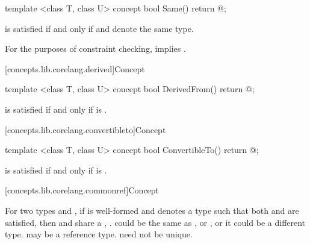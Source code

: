 %
\begin{itemdecl}
template <class T, class U>
concept bool Same() {
  return @\seebelow@;
}
\end{itemdecl}

\begin{itemdescr}
\pnum
{} is satisfied if and
only if  and  denote the same type.

\pnum
\remarks For the purposes of constraint checking,  implies
.
\end{itemdescr}

[concepts.lib.corelang.derived]{Concept }

%
\begin{itemdecl}
template <class T, class U>
concept bool DerivedFrom() {
  return @\seebelow@;
}
\end{itemdecl}

\begin{itemdescr}
\pnum
{} is satisfied if and only if
 is .
\end{itemdescr}

[concepts.lib.corelang.convertibleto]{Concept }

%
\begin{itemdecl}
template <class T, class U>
concept bool ConvertibleTo() {
  return @\seebelow@;
}
\end{itemdecl}

\begin{itemdescr}
\pnum
{} is satisfied
if and only if  is .
\end{itemdescr}

[concepts.lib.corelang.commonref]{Concept }

\pnum
For two types  and , if 
is well-formed and denotes a type  such that both
 and  are
satisfied, then  and  share a , . \enternote {} could be the same as , or
, or it could be a different type.  may be a reference
type.  need not be unique.\exitnote

